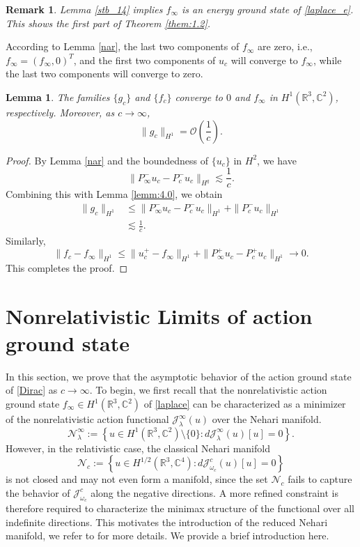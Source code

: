 \documentclass{amsart}
\theoremstyle{plain}
\newtheorem{lemma}[theorem]{Lemma}
\newtheorem{remark}[theorem]{Remark}
\theoremstyle{definition}
\theoremstyle{remark}
\numberwithin{equation}{section} \numberwithin{figure}{section}
\begin{document}
\begin{remark}
     Lemma \ref{stb_14} implies $f_\infty $ is an energy ground state of  \eqref{laplace_e}.  This shows the first part of Theorem \ref{them:1.2}.
\end{remark}

  According to Lemma \ref{nar}, the last two components of $f_\infty$ are zero,  i.e., $f_\infty= (f_\infty,0)^T$, and the first 
  two components of $u_c$ will converge to $f_\infty$, while the last two components will converge to zero.


  \begin{lemma}\label{lemm:4.2}
    The families \(\{g_c\}\) and \(\{f_c\}\) converge to \(0\) and \(f_\infty\) in \(H^1(\mathbb{R}^3, \mathbb{C}^2)\), respectively. Moreover, as \(c \to \infty\),
    \[
    \|g_c\|_{H^1} = \mathcal{O}\left(\frac{1}{c}\right).
    \]
  \end{lemma}
  
  \begin{proof}
  By Lemma \ref{nar} and the boundedness of \(\{u_c\}\) in \(H^2\), we have
  \[
  \|P_\infty^- u_c - P_c^- u_c\|_{H^q} \lesssim \frac{1}{c}.
  \]
  Combining this with Lemma \ref{lemm:4.0}, we obtain
  \begin{align*}
  \|g_c\|_{H^1} 
  &\leq \|P_\infty^- u_c - P_c^- u_c\|_{H^1} + \|P_c^- u_c\|_{H^1} \\
  &\lesssim \frac{1}{c}.
  \end{align*}
  Similarly,
  \[
  \|f_c - f_\infty\|_{H^1} \leq \|u_c^+ - f_\infty\|_{H^1} + \|P_\infty^+ u_c - P_c^+ u_c\|_{H^1} \to 0.
  \]
  This completes the proof.
  \end{proof}





\section{Nonrelativistic Limits  of action ground state}\label{section5}
\medskip
In this section, we prove that the asymptotic behavior of the action ground state of \eqref{Dirac} 
 as \(c\to\infty\).  
To begin, we first recall that the nonrelativistic action ground state \( f_\infty\in H^1(\mathbb{R}^3, \mathbb{C}^2) \) of \eqref{laplace} can be characterized as a minimizer of the nonrelativistic action functional \( \mathcal{J}^\infty_\lambda(u) \) over the Nehari manifold.  
\[
\mathcal{N}_\lambda^\infty := \left\{ u \in H^{1}(\mathbb{R}^3, \mathbb{C}^2) \setminus \{0\} : d\mathcal{J}_{\lambda}^\infty(u)[u] = 0 \right\}.
\]
However, in the relativistic case, the classical Nehari manifold
 \[ \mathcal{N}_c:=\left\{u\in H^{1/2}(\mathbb{R}^3, \mathbb{C}^4):d\mathcal{J}_{\omega_c}^c(u)[u]=0 \right\} \]  
is not closed and may not even form a manifold, 
since the set \( \mathcal{N}_c \) fails to capture the behavior of \( \mathcal{J}_{\omega_c}^c \) 
along the negative directions. A more refined constraint is therefore required 
to characterize the minimax structure of the functional over all indefinite directions. 
This motivates the introduction of the reduced Nehari manifold,
we refer to \cite{MR2216902,SzulkinWeth} for more details. We provide a brief introduction here.
\end{document}
